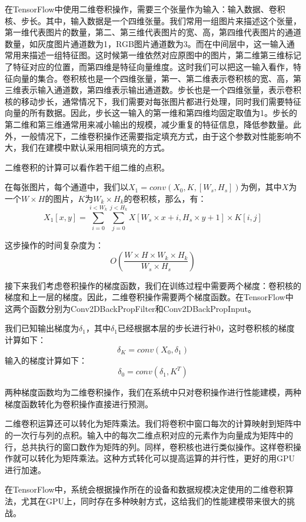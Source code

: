     在TensorFlow中使用二维卷积操作，需要三个张量作为输入：输入数据、卷积核、步长。其中，输入数据是一个四维张量。我们常用一组图片来描述这个张量，第一维代表图片的数量，第二、第三维代表图片的宽、高，第四维代表图片的通道数量，如灰度图片通道数为1，RGB图片通道数为3。而在中间层中，这一输入通常用来描述一组特征图。这时候第一维依然对应原图中的图片，第二维第三维标记了特征对应的位置，而第四维是特征向量维度。这时我们可以把这一输入看作，特征向量的集合。卷积核也是一个四维张量，第一、第二维表示卷积核的宽、高，第三维表示输入通道数，第四维表示输出通道数。步长也是一个四维张量，表示卷积核的移动步长，通常情况下，我们需要对每张图片都进行处理，同时我们需要特征向量的所有数据。因此，步长这一输入的第一维和第四维均固定取值为1。步长的第二维和第三维通常用来减小输出的规模，减少重复的特征信息，降低参数量。此外，一般情况下，二维卷积操作还需要指定填充方式，由于这个参数对性能影响不大，我们在建模中默认采用相同填充的方式。

    二维卷积的计算可以看作若干组二维的点积。
    
    在每张图片，每个通道中，我们以$ X_1 = conv(X_0, K, [W_s, H_s]) $为例，其中$ X $为一个$ W \times H $的图片，$ K $为$ W_k \times H_k $的卷积核，那么，有：
    $$
        X_1[x, y] = \sum_{i=0}^{i < W_k}\sum_{j=0}^{j < H_k}X[W_s \times x + i, H_s \times y + 1] \times K[i, j]
    $$
    
    这步操作的时间复杂度为：
    $$
        O\left(\frac{W \times H \times W_k \times H_k}{W_s \times H_s}\right)
    $$

    接下来我们考虑卷积操作的梯度函数，我们在训练过程中需要两个梯度：卷积核的梯度和上一层的梯度。因此，二维卷积操作需要两个梯度函数。在TensorFlow中这两个函数分别为Conv2DBackPropFilter和Conv2DBackPropInput。
    
    我们已知输出梯度为$ \delta_1 $，其中$ \delta_1 $已经根据本层的步长进行补0，这时卷积核的梯度计算如下：
    $$
        \delta_K = conv(X_0, \delta_1)
    $$
    输入的梯度计算如下：
    $$
        \delta_0 = conv(\delta_1, K^T)
    $$
    
    两种梯度函数均为二维卷积操作，我们在系统中只对卷积操作进行性能建模，两种梯度函数转化为卷积操作直接进行预测。
    
    二维卷积运算还可以转化为矩阵乘法\cite{im2col}。我们将卷积中窗口每次的计算映射到矩阵中的一次行与列的点积。输入中的每次二维点积对应的元素作为向量成为矩阵中的行，总共执行的窗口数作为矩阵的列。同样，卷积核也进行类似操作。这样卷积操作就可以转化为矩阵乘法。这种方式转化可以提高运算的并行性，更好的用GPU进行加速。
    
    在TensorFlow中，系统会根据操作所在的设备和数据规模决定使用的二维卷积算法，尤其在GPU上，同时存在多种映射方式，这给我们的性能建模带来很大的挑战。


